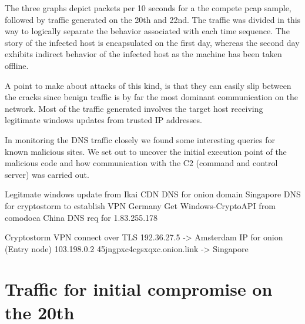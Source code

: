 \documentclass[11pt]{diazessay} %
\begin{document}
The three graphs depict packets per 10 seconds for a the compete pcap sample, followed by traffic generated on the 20th and 22nd. The traffic was divided in this way to logically separate the behavior associated with each time sequence. The story of the infected host is encapsulated on the first day, whereas the second day exhibits indirect behavior of the infected host as the machine has been taken offline.  

A point to make about attacks of this kind, is that they can easily slip between the cracks since benign traffic is by far the most dominant communication on the network. Most of the traffic generated involves the target host receiving legitimate windows updates from trusted IP addresses. 

In monitoring the DNS traffic closely we found some interesting queries for known malicious sites. We set out to uncover the initial execution point of the malicious code and how communication with the C2 (command and control server) was carried out.

Legitmate windows update from Ikai CDN 
DNS for onion domain Singapore 
DNS for cryptostorm to establish VPN Germany
Get Windows-CryptoAPI from comodoca 
China DNS req  for 1.83.255.178 

Cryptostorm VPN connect over TLS 
192.36.27.5 -> Amsterdam IP for onion (Entry node)
103.198.0.2     45jngpxc4cgsxqxc.onion.link -> Singapore


\section*{Traffic for initial compromise on the 20th}
\end{document}
